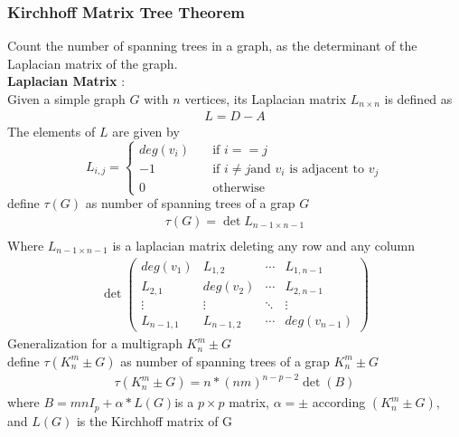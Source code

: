 \documentclass{article}
\begin{document}
\begin{multicols*}{2}
			\subsubsection{Kirchhoff Matrix Tree Theorem}
			Count the number of spanning trees in a graph, as the determinant of the Laplacian matrix of the graph. 
			\\
			\textbf{Laplacian Matrix} :
			\\Given a simple graph $G$ with $n$ vertices,
			its Laplacian matrix $L_{n\times n}$ is defined as\\
			\begin{align*}
				L=D-A
			\end{align*}
			The elements of $L$ are given by
			\[ L_{i,j} =
			\begin{cases}
				deg(v_{i})       & \quad \text{if } i == j\\
				-1  & \quad \text{if } i \neq j \text{and } v_{i} \text{ is adjacent to }v_{j}\\
				0 & \quad \text{otherwise}
			\end{cases}
			\]
			 define $\tau(G  )$ as number of spanning trees of a grap $G$
			\begin{align*}
				\tau(G) = \det L_{n-1\times n-1}\\
			\end{align*}
			Where  $L_{n-1 \times n-1}$ is a laplacian matrix deleting 
			any row and any column
			\begin{align*}
				\det
				\begin{pmatrix}
					deg(v_{1}) & L_{1,2} & \cdots & L_{1,n-1} \\
				L_{2,1} & deg(v_{2}) & \cdots & L_{2,n-1} \\
				\vdots  & \vdots  & \ddots & \vdots  \\
				L_{n-1,1} & L_{n-1,2} & \cdots & deg(v_{n-1}) 
				\end{pmatrix}
			\end{align*}
			Generalization for a multigraph $K_{n}^{m} \pm G$\\
			define $\tau(K_{n}^{m} \pm G)$ as number of spanning trees of a grap $K_{n}^{m} \pm G$
			\begin{align*}
				\tau(K_{n}^{m} \pm G) = n * (nm)^{n-p-2}\det (B)
			\end{align*}
			where $B = mnI_{p} +\alpha * L(G)$is a $p\times p$ matrix, $\alpha = \pm$  according 
			$(K_{n}^{m} \pm G)$, and $L(G)$ is the Kirchhoff	matrix of G


\end{multicols*}
\end{document}
